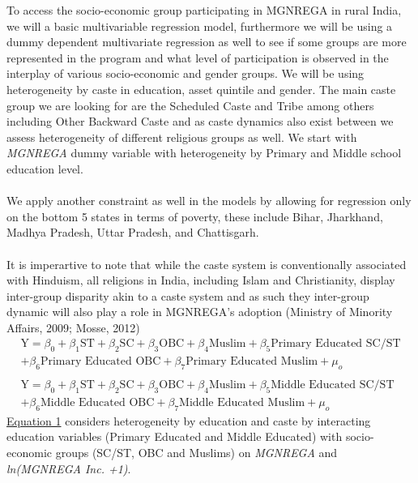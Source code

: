 \documentclass{article}
\begin{document}
To access the socio-economic group participating in MGNREGA in rural India, we will a basic multivariable regression model, furthermore we will be using a dummy dependent multivariate regression as well to see if some groups are more represented in the program and what level of participation is observed in the interplay of various socio-economic and gender groups. We will be using heterogeneity by caste in education, asset quintile and gender. The main caste group we are looking for are the Scheduled Caste and Tribe among others including Other Backward Caste and as caste dynamics also exist between we assess heterogeneity of different religious groups as well. We start with \emph{MGNREGA} dummy variable with heterogeneity by Primary and Middle school education level. 
\\
\\
We apply another constraint as well in the models by allowing for regression only on the bottom 5 states in terms of poverty, these include Bihar, Jharkhand, Madhya Pradesh, Uttar Pradesh, and Chattisgarh. \\
\\

It is imperartive to note that while the caste system is conventionally associated with Hinduism, all religions in India, including Islam and Christianity, display inter-group disparity akin to a caste system and as such they inter-group dynamic will also play a role in MGNREGA's adoption (Ministry of Minority Affairs, 2009; Mosse, 2012)
\begin{equation}
\begin{aligned}
\text{Y} = \beta_{0} + \beta_{1}\text{ST}+\beta_{2}\text{SC}+ \beta_{3}\text{OBC} + \beta_{4}\text{Muslim} + \beta_{5}\text{Primary Educated SC/ST}\\ + \beta_{6}\text{Primary Educated OBC} + \beta_{7}\text{Primary Educated Muslim}  +\mu_{o} \\\\
\text{Y} = \beta_{0} + \beta_{1}\text{ST}+\beta_{2}\text{SC}+ \beta_{3}\text{OBC} + \beta_{4}\text{Muslim}+ \beta_{5}\text{Middle Educated SC/ST}\\+ \beta_{6}\text{Middle Educated OBC}+ \beta_{7}\text{Middle Educated Muslim}  +\mu_{o}
\end{aligned}
\label{eq1}
\end{equation}
\hyperref[eq1]{Equation 1} considers heterogeneity by education and caste by interacting education variables (Primary Educated and Middle Educated) with socio-economic groups (SC/ST, OBC and Muslims) on \emph{MGNREGA} and \emph{ln(MGNREGA Inc. +1)}.
\end{document}
